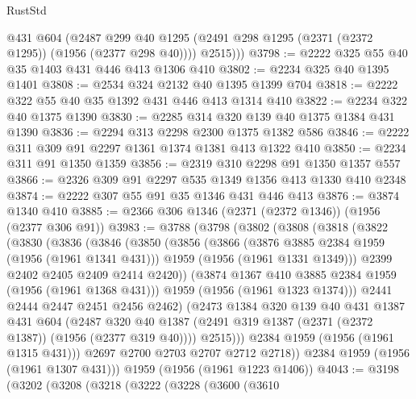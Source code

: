 \begin{lexlean}{RustStd}
\begin{coremodule}
          @431
          @604
          (@2487 @299 @40 @1295 (@2491 @298 @1295 (@2371 (@2372 @1295)) (@1956 (@2377 @298 @40))))
          @2515)))
@3798 := @2222 @325 @55 @40 @35 @1403 @431 @446 @413 @1306 @410
@3802 := @2234 @325 @40 @1395 @1401
@3808 := @2534 @324 @2132 @40 @1395 @1399 @704
@3818 := @2222 @322 @55 @40 @35 @1392 @431 @446 @413 @1314 @410
@3822 := @2234 @322 @40 @1375 @1390
@3830 := @2285 @314 @320 @139 @40 @1375 @1384 @431 @1390
@3836 := @2294 @313 @2298 @2300 @1375 @1382 @586
@3846 := @2222 @311 @309 @91 @2297 @1361 @1374 @1381 @413 @1322 @410
@3850 := @2234 @311 @91 @1350 @1359
@3856 := @2319 @310 @2298 @91 @1350 @1357 @557
@3866 := @2326 @309 @91 @2297 @535 @1349 @1356 @413 @1330 @410 @2348
@3874 := @2222 @307 @55 @91 @35 @1346 @431 @446 @413
@3876 := @3874 @1340 @410
@3885 := @2366 @306 @1346 (@2371 (@2372 @1346)) (@1956 (@2377 @306 @91))
@3983 := @3788
    (@3798
      (@3802
        (@3808
          (@3818
            (@3822
              (@3830
                (@3836
                  (@3846
                    (@3850
                      (@3856
                        (@3866
                          (@3876 @3885 @2384 @1959 (@1956 (@1961 @1341 @431)))
                          @1959
                          (@1956 (@1961 @1331 @1349)))
                        @2399
                        @2402
                        @2405
                        @2409
                        @2414
                        @2420))
                    (@3874 @1367 @410 @3885 @2384 @1959 (@1956 (@1961 @1368 @431)))
                    @1959
                    (@1956 (@1961 @1323 @1374)))
                  @2441
                  @2444
                  @2447
                  @2451
                  @2456
                  @2462)
                (@2473
                  @1384
                  @320
                  @139
                  @40
                  @431
                  @1387
                  @431
                  @604
                  (@2487
                    @320
                    @40
                    @1387
                    (@2491 @319 @1387 (@2371 (@2372 @1387)) (@1956 (@2377 @319 @40))))
                  @2515)))
            @2384
            @1959
            (@1956 (@1961 @1315 @431)))
          @2697
          @2700
          @2703
          @2707
          @2712
          @2718))
      @2384
      @1959
      (@1956 (@1961 @1307 @431)))
    @1959
    (@1956 (@1961 @1223 @1406))
@4043 := @3198
    (@3202
      (@3208
        (@3218
          (@3222
            (@3228
              (@3600
                (@3610

\end{coremodule}
\end{lexlean}
